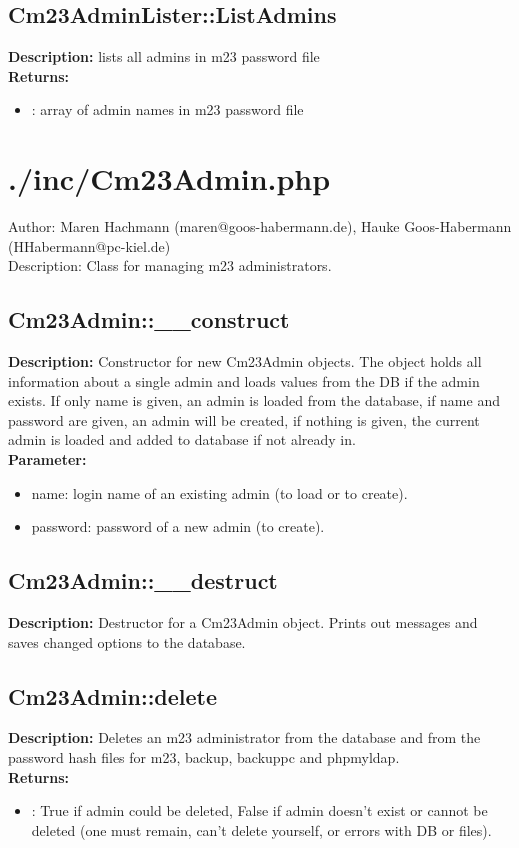 \subsection{Cm23AdminLister::ListAdmins}
\textbf{Description:} lists all admins in m23 password file\\
\textbf{Returns:}
\begin{itemize}
\item : array of admin names in m23 password file
\end{itemize}

\newpage\section{./inc/Cm23Admin.php}
 Author: Maren Hachmann (maren@goos-habermann.de), Hauke Goos-Habermann (HHabermann@pc-kiel.de)\\
 Description: Class for managing m23 administrators.\\

\subsection{Cm23Admin::\_\_construct}
\textbf{Description:} Constructor for new Cm23Admin objects. The object holds all information about a single admin and loads values from the DB if the admin exists. If only name is given, an admin is loaded from the database, if name and password are given, an admin will be created, if nothing is given, the current admin is loaded and added to database if not already in.\\
\textbf{Parameter:}
\begin{itemize}
\item name: login name of an existing admin (to load or to create).
\item password: password of a new admin (to create).
\end{itemize}

\subsection{Cm23Admin::\_\_destruct}
\textbf{Description:} Destructor for a Cm23Admin object. Prints out messages and saves changed options to the database.\\

\subsection{Cm23Admin::delete}
\textbf{Description:} Deletes an m23 administrator from the database and from the password hash files for m23, backup, backuppc and phpmyldap.\\
\textbf{Returns:}
\begin{itemize}
\item : True if admin could be deleted, False if admin doesn't exist or cannot be deleted (one must remain, can't delete yourself, or errors with DB or files).
\end{itemize}

